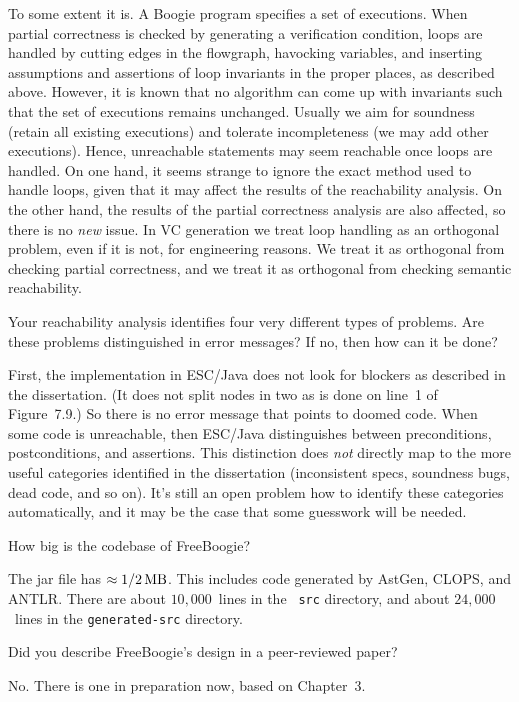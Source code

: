 \A To some extent it is. A Boogie program specifies a set of executions.
When partial correctness is checked by generating a verification condition,
loops are handled by cutting edges in the flowgraph, havocking variables,
and inserting assumptions and assertions of loop invariants in the proper
places, as described above. However, it is known that no algorithm can come
up with invariants such that the set of executions remains unchanged.
Usually we aim for soundness (retain all existing executions) and tolerate
incompleteness (we may add other executions). Hence, unreachable statements
may seem reachable once loops are handled. On one hand, it seems strange to
ignore the exact method used to handle loops, given that it may affect the
results of the reachability analysis. On the other hand, the results of the
partial correctness analysis are also affected, so there is no {\it new\/}
issue. In VC generation we treat loop handling as an orthogonal problem,
even if it is not, for engineering reasons. We treat it as orthogonal from
checking partial correctness, and we treat it as orthogonal from checking
semantic reachability.


\Q Your reachability analysis identifies four very different types of
problems.  Are these problems distinguished in error messages? If no, then
how can it be done?

\A First, the implementation in ESC/Java does not look for blockers as
described in the dissertation. (It does not split nodes in two as is done
on line~1 of Figure~7.9.) So there is no error message that points to
doomed code. When some code is unreachable, then ESC/Java distinguishes
between preconditions, postconditions, and assertions. This distinction
does {\it not\/} directly map to the more useful categories identified in
the dissertation (inconsistent specs, soundness bugs, dead code, and so
on).  It's still an open problem how to identify these categories
automatically, and it may be the case that some guesswork will be needed.


\Q How big is the codebase of FreeBoogie?

\A The jar file has $\approx1/2\rm\,MB$. This includes code generated by
AstGen, CLOPS, and ANTLR\null. There are about $10{,}000$~lines in the {\tt
src} directory, and about $24{,}000$~lines in the {\tt generated-src}
directory.

\Q Did you describe FreeBoogie's design in a peer-reviewed paper?

\A No. There is one in preparation now, based on Chapter~3.

